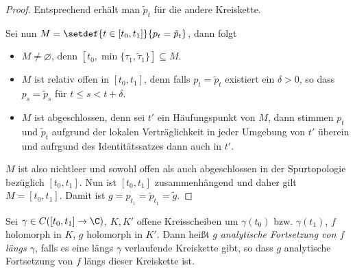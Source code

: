 \begin{proof}
Entsprechend erhält man $\tilde{p}_t$ für die andere Kreiskette.

Sei nun $M = \setdef{t\in[t_0,t_1]}{p_t = \tilde{p}_t}$, dann folgt
\begin{itemize}
  \item $M\neq\varnothing$, denn $[t_0,\min\{\tau_1,\tilde{\tau}_1\}]\subseteq
  M$.
  \item $M$ ist relativ offen in $[t_0,t_1]$, denn falls $p_t = \tilde{p}_t$
  existiert ein $\delta > 0$, so dass $p_s = \tilde{p}_s$ für $t\le s <t+\delta$.
  \item $M$ ist abgeschlossen, denn sei $t'$ ein Häufungspunkt von $M$, dann
  stimmen $p_t$ und $\tilde{p}_t$ aufgrund der lokalen Verträglichkeit in jeder
  Umgebung von $t'$ überein und aufrgund des Identitätssatzes dann auch in $t'$.
\end{itemize}
$M$ ist also nichtleer und sowohl offen als auch abgeschlossen in der
Spurtopologie bezüglich $[t_0,t_1]$. Nun ist $[t_0,t_1]$ zusammenhängend und
daher gilt $M=[t_0,t_1]$. Damit ist $g = p_{t_1} = \tilde{p}_{t_1} = \tilde{g}$.\qedhere
\end{proof}

\begin{defn}
\label{defn:2.70}
Sei $\gamma\in C([t_0,t_1]\to\C)$, $K,K'$ offene Kreisscheiben um
$\gamma(t_0)$ bzw. $\gamma(t_1)$, $f$ holomorph in $K$, $g$ holomorph in $K'$.
Dann heißt $g$ \emph{analytische Fortsetzung von $f$ längs $\gamma$}, falls es
eine längs $\gamma$ verlaufende Kreiskette gibt, so dass $g$ analytische
Fortsetzung von $f$ längs dieser Kreiskette ist.\fishhere
\end{defn}

